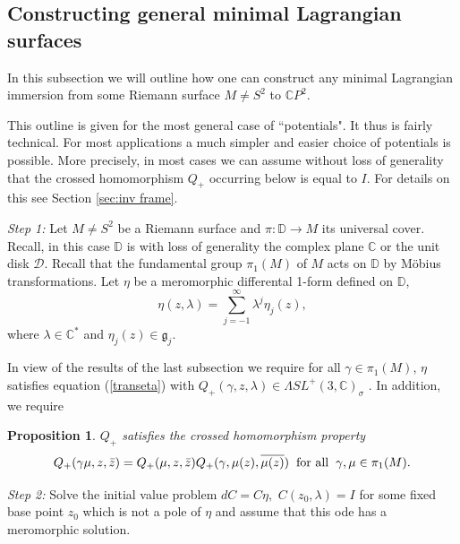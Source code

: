 \documentclass[a4paper,11pt]{amsart}
\newtheorem{proposition}[theorem]{Proposition}
\theoremstyle{definition}
\numberwithin{equation}{section}
\newcommand{\C}{\mathbb{C}}
\newcommand{\D}{\mathbb{D}}
\begin{document}
\subsection{Constructing general minimal Lagrangian surfaces}
\label{subsec:construction}

 
 In this subsection we will outline how one can construct any minimal Lagrangian immersion from some Riemann surface $M \neq S^2$ to $\C P^2$.
 
 This outline is given for the most general case of ``potentials".
 It thus is fairly technical. For most applications a much simpler and easier 
 choice of potentials is possible. More precisely, in most cases we can
 assume without  loss of generality that the crossed homomorphism $Q_+$ occurring below is equal to $I$.
 For details on this see Section \ref{sec:inv frame}.
 
{\it Step 1:}  Let $M \neq S^2$ be a Riemann surface and $\pi: \D \rightarrow M$ its universal cover. Recall, in this case $\D$ is with loss of generality the complex plane 
 $\C$ or the unit disk $\mathcal{D}$.  Recall that the fundamental group 
 $\pi_1(M)$ of $M$ acts on $\D$ by M\"{o}bius transformations. Let $\eta$ be a meromorphic differental 1-form defined on $\D$,
 \begin{equation}
 \eta(z,\lambda) = \sum_{j = -1}^\infty  \lambda^j \eta_j(z),
 \end{equation}
 where $\lambda \in \C^*$ and $\eta_j(z) \in \mathfrak{g}_j.$
 
 In view of the results of the last subsection we require for all $\gamma \in \pi_1(M)$, 
$ \eta$ satisfies equation (\ref{transeta}) with 
$Q_+(\gamma, z,\lambda) \in \Lambda SL^+(3,\C)_{\sigma}$ .
In addition, we require
 \begin{proposition}
 $Q_+$ satisfies the crossed homomorphism property
 \begin{equation}
      Q_+(\gamma \mu, z, \bar z) = Q_+(\mu, z, \bar z) Q_+(\gamma, \mu(z), \overline{ \mu(z)}) 
  \hspace{2mm}  \text{for all} \hspace{2mm} \gamma,\mu \in \pi_1(M).
 \end{equation}
 \end{proposition}
 
 {\it Step 2:} Solve the initial value problem $dC = C \eta,$ $ C(z_0,\lambda)= I$
 for some fixed base point $z_0$ which is not a pole of $\eta$ and assume that this ode has a meromorphic solution.
 \vspace{4mm}
 
\end{document}
